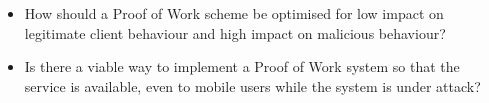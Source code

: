 \begin{itemize}
\item How should a Proof of Work scheme be optimised for low impact on legitimate client behaviour and high impact on malicious behaviour?

\item Is there a viable way to implement a Proof of Work system so that the service is available, even to mobile users while the system is under attack?

\end{itemize}

\begin{comment}
With the problem defined the question at hand is thus if it is possible to develop a Proof of Work protocol that is independent of client characteristics.
\begin{itemize}
\item Is there a viable way to implement a Proof of Work system so that the system's resources are accessable by a diverse variety of devices?

\item How should the protocol be optimised for low impact on legitimate client behaviour and high impact on malicious behaviour?

\item What advantages and disadvantages does proof of work concept bring in practice and in which applications could it be an improvement to current security?
\end{itemize}
\end{comment}